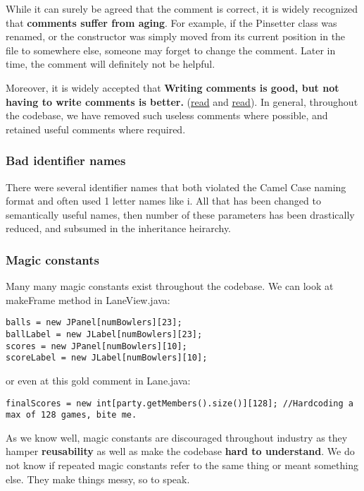 While it can surely be agreed that the comment is correct, it is widely recognized that \textbf{comments suffer from aging}. For example, if the Pinsetter class was renamed, or the constructor was simply moved from its current position in the file to somewhere else, someone may forget to change the comment. Later in time, the comment will definitely not be helpful.

Moreover, it is widely accepted that \textbf{Writing comments is good, but not having to write comments is better.} (\hyperlink{https://softwareengineering.stackexchange.com/a/335513/131646}{read} and \hyperlink{https://www.freecodecamp.org/news/code-comments-the-good-the-bad-and-the-ugly-be9cc65fbf83/}{read}). In general, throughout the codebase, we have removed such useless comments where possible, and retained useful comments where required.

\subsubsection{Bad identifier names}

There were several identifier names that both violated the Camel Case naming format and often used 1 letter names like i. All that has been changed to semantically useful names, then number of these parameters has been drastically reduced, and subsumed in the inheritance heirarchy.

\subsubsection{Magic constants}

Many many magic constants exist throughout the codebase. We can look at makeFrame method in LaneView.java:

\begin{verbatim}
balls = new JPanel[numBowlers][23];
ballLabel = new JLabel[numBowlers][23];
scores = new JPanel[numBowlers][10];
scoreLabel = new JLabel[numBowlers][10];
\end{verbatim}

or even at this gold comment in Lane.java:

\begin{verbatim}
finalScores = new int[party.getMembers().size()][128]; //Hardcoding a max of 128 games, bite me.
\end{verbatim}

As we know well, magic constants are discouraged throughout industry as they hamper \textbf{reusability} as well as make the codebase \textbf{hard to understand}. We do not know if repeated magic constants refer to the same thing or meant something else. They make things messy, so to speak.

